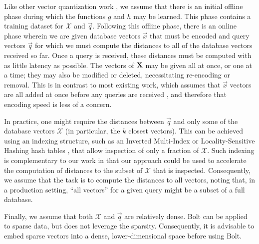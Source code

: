 Like other vector quantization work \cite{pq,lsq,otq,opq,cq}, we assume that there is an initial offline phase during which the functions $g$ and $h$ may be learned. This phase contains a training dataset for $\mathcal{X}$ and $\vec{q}$. Following this offline phase, there is an online phase wherein we are given database vectors $\vec{x}$ that must be encoded and query vectors $\vec{q}$ for which we must compute the distances to all of the database vectors received so far. Once a query is received, these distances must be computed with as little latency as possible. The vectors of $\mathbf{X}$ may be given all at once, or one at a time; they may also be modified or deleted, necessitating re-encoding or removal. This is in contrast to most existing work, which assumes that $\vec{x}$ vectors are all added at once before any queries are received \cite{pq,lsq,otq,opq,cq}, and therefore that encoding speed is less of a concern.

In practice, one might require the distances between $\vec{q}$ and only some of the database vectors $\mathcal{X}$ (in particular, the $k$ closest vectors). This can be achieved using an indexing structure, such as an Inverted Multi-Index \cite{IMI, NOIMI} or Locality-Sensitive Hashing hash tables \cite{E2LSH, crosspolytopeLSH}, that allow inspection of only a fraction of $\mathcal{X}$. Such indexing is complementary to our work in that our approach could be used to accelerate the computation of distances to the subset of $\mathcal{X}$ that is inspected. Consequently, we assume that the task is to compute the distances to all vectors, noting that, in a production setting, ``all vectors'' for a given query might be a subset of a full database.

Finally, we assume that both $\mathcal{X}$ and $\vec{q}$ are relatively dense. Bolt can be applied to sparse data, but does not leverage the sparsity. Consequently, it is advisable to embed sparse vectors into a dense, lower-dimensional space before using Bolt.


\vspace{-2mm}



